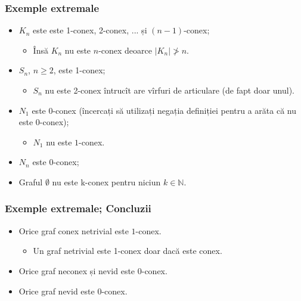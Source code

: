 \begin{frame}
  \frametitle{Exemple extremale}

\begin{itemize}
  \item $K_n$ este este 1-conex, 2-conex, ... și $(n-1)$-conex;\pause
    \begin{itemize}
      \item Însă $K_n$ nu este $n$-conex deoarce $|K_n|\not> n$.\pause
    \end{itemize}
  \item $S_n$, $n\geq 2$, este 1-conex;\pause
    \begin{itemize}
      \item $S_n$ nu este 2-conex întrucît are vîrfuri de articulare (de fapt doar unul).\pause
    \end{itemize}
  \item $N_1$ este $0$-conex (încercați să utilizați negația definiției pentru a arăta că nu este 0-conex);\pause
    \begin{itemize}
      \item $N_1$ nu este $1$-conex.\pause
    \end{itemize}
  \item $N_n$ este $0$-conex;\pause
  \item Graful $\emptyset$ nu este k-conex pentru niciun $k\in\mathbb{N}$.
\end{itemize}

\end{frame}


\begin{frame}
  \frametitle{Exemple extremale; Concluzii}

\begin{itemize}
  \item Orice graf conex netrivial este $1$-conex.\pause
    \begin{itemize}
      \item Un graf netrivial este 1-conex doar dacă este conex.\pause
    \end{itemize}
  \item Orice graf neconex și nevid este $0$-conex.\pause
  \item Orice graf nevid este $0$-conex.
\end{itemize}


\end{frame}

